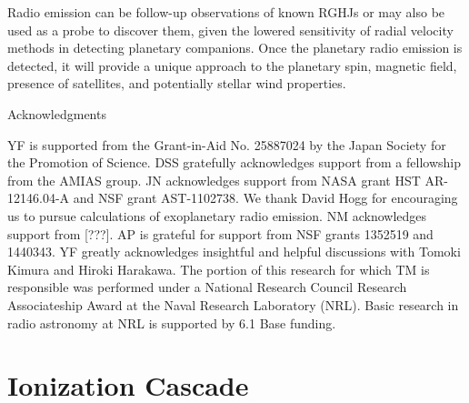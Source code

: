 \documentclass[iop,numberedappendix,apj]{emulateapj}
\begin{document}
Radio emission can be follow-up observations of known RGHJs or may also be used as a probe to discover them, given the lowered sensitivity of  radial velocity methods in detecting planetary companions. 
Once the planetary radio emission is detected, it will provide a unique approach to the planetary spin, magnetic field, presence of satellites, and potentially stellar wind properties. 


\vspace{0.5in}

\acknowledgements

{\sc Acknowledgments}

YF is supported from the Grant-in-Aid No. 25887024 by the Japan Society for the Promotion of Science.
DSS gratefully acknowledges support from a fellowship from the AMIAS group. JN acknowledges support from NASA grant HST AR-12146.04-A and NSF grant AST-1102738.
We thank David Hogg for encouraging us to pursue calculations of exoplanetary radio emission.
NM acknowledges support from [???]. 
AP is grateful for support from NSF grants 1352519 and 1440343.
YF greatly acknowledges insightful and helpful discussions with Tomoki Kimura and Hiroki Harakawa. 
The portion of this research for which TM is responsible was performed under a National Research 
Council Research Associateship Award at the Naval Research Laboratory (NRL).
Basic research in radio astronomy at NRL is supported by 6.1 Base funding.





\newpage

\appendix



\section{Ionization Cascade}
\label{sec:AppendixA}
\end{document}

